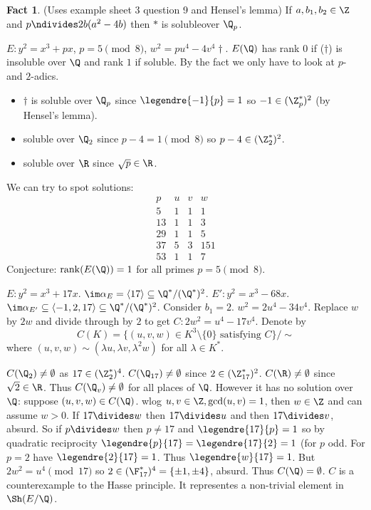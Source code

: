 \documentclass[a4paper]{article}
\theoremstyle{definition}
\newtheorem*{fact}{Fact}
\theoremstyle{theorem}
\begin{document}
\begin{fact}
  (Uses example sheet 3 question 9 and Hensel's lemma) If \(a, b_1, b_2 \in \Z\) and \(p \ndivides 2b(a^2 - 4b)\) then \(\ast\) is solubleover \(\Q_p\).
\end{fact}

\begin{eg}
  \(E: y^2 = x^3 + px\), \(p = 5 \pmod 8\), \(w^2 = pu^4 - 4v^4 \dagger\). \(E(\Q)\) has rank \(0\) if (\(\dagger\)) is insoluble over \(\Q\) and rank \(1\) if soluble. By the fact we only have to look at \(p\)- and \(2\)-adics.
  \begin{itemize}
  \item \(\dagger\) is soluble over \(\Q_p\) since \(\legendre{-1}{p} = 1\) so \(-1 \in (\Z_p^*)^2\) (by Hensel's lemma).
  \item soluble over \(\Q_2\) since \(p - 4 = 1 \pmod 8\) so \(p - 4 \in (\Z_2^*)^2\).
  \item soluble over \(\R\) since \(\sqrt p \in \R\).
  \end{itemize}
  We can try to spot solutions:
  \[
    \begin{array}{c|ccc}
      p & u & v & w \\ \hline
      5 & 1 & 1 & 1 \\
      13 & 1 & 1 & 3 \\
      29 & 1 & 1 & 5 \\
      37 & 5 & 3 & 151 \\
      53 & 1 & 1 & 7
    \end{array}
  \]
  Conjecture: \(\mathrm{rank}(E(\Q)) = 1\) for all primes \(p = 5 \pmod 8\).
\end{eg}

\begin{eg}[Lind]
  \(E: y^2 = x^3 + 17x\). \(\im \alpha_E = \langle 17 \rangle \subseteq \Q^*/(\Q^*)^2\). \(E': y^2 = x^3 - 68x\). \(\im \alpha_{E'} \subseteq \langle -1, 2, 17 \rangle \subseteq \Q^*/(\Q^*)^2\). Consider \(b_1 = 2\). \(w^2 = 2u^4 - 34v^4\). Replace \(w\) by \(2w\) and divide through by \(2\) to get \(C: 2w^2 = u^4 - 17v^4\). Denote by
  \[
    C(K) = \{(u, v, w) \in K^3 \setminus \{0\} \text{ satisfying } C\}/\sim
  \]
  where \((u, v, w) \sim (\lambda u, \lambda v, \lambda^2 w)\) for all \(\lambda \in K^*\).

  \(C(\Q_2) \ne \emptyset\) as \(17 \in (\Z_2^*)^4\). \(C(\Q_{17}) \neq \emptyset\) since \(2 \in (\Z_{17}^*)^2\). \(C(\R) \ne \emptyset\) since \(\sqrt 2 \in \R\). Thus \(C(\Q_v) \ne \emptyset\) for all places of \(\Q\). However it has no solution over \(\Q\): suppose \((u, v, w) \in C(\Q)\). wlog \(u, v\in \Z, \gcd(u, v) = 1\), then \(w \in \Z\) and can assume \(w > 0\). If \(17 \divides w\) then \(17 \divides u\) and then \(17 \divides v\), absurd. So if \(p \divides w\) then \(p \ne 17\) and \(\legendre{17}{p} = 1\) so by quadratic reciprocity \(\legendre{p}{17} = \legendre{17}{2} = 1\) (for \(p\) odd. For \(p = 2\) have \(\legendre{2}{17} = 1\). Thus \(\legendre{w}{17} = 1\). But \(2w^2 = u^4 \pmod{17}\) so \(2 \in (\F_{17}^*)^4 = \{\pm 1, \pm 4\}\), absurd. Thus \(C(\Q) = \emptyset\). \(C\) is a counterexample to the Hasse principle. It representes a non-trivial element in \(\Sh(E/\Q)\).
\end{eg}
\end{document}
